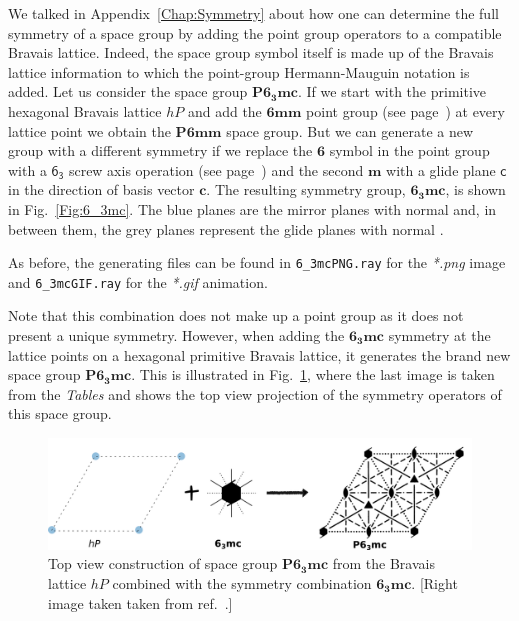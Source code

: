 We talked in Appendix~\ref{Chap:Symmetry} about how one can determine the full symmetry of a space group by adding the point group operators to a compatible Bravais lattice. Indeed, the space group symbol itself is made up of the Bravais lattice information to which the point-group Hermann-Mauguin notation is added. Let us consider the space group $\mathbf{P6_3mc}$. If we start with the primitive hexagonal Bravais lattice $hP$ and add the $\mathbf{6mm}$ point group (see page~\pageref{subChap:pointGroup}) at every lattice point we obtain the $\mathbf{P6mm}$ space group. But we can generate a new group with a different symmetry if we replace the $\mathbf{6}$ symbol in the point group with a $\mathsf{6_3}$ screw axis operation (see page~\pageref{sec:screw}) and the second $\mathbf{m}$ with a glide plane $\mathsf{c}$ in the direction of basis vector $\mathbf{c}$. The resulting symmetry group, $\mathbf{6_3mc}$, is shown in Fig.~\ref{Fig:6_3mc}. The blue planes are the mirror planes with normal  and, in between them, the grey planes represent the glide planes with normal . 


As before, the generating files can be found in \texttt{6\_3mcPNG.ray} for the \textit{*.png} image and \texttt{6\_3mcGIF.ray} for the \textit{*.gif} animation. 


Note that this combination does not make up a point group as it does not present a unique symmetry. However, when adding the $\mathbf{6_3mc}$ symmetry at the lattice points on a hexagonal primitive Bravais lattice, it generates the brand new space group $\mathbf{P6_3mc}$. This is illustrated in Fig.~\ref{Fig:P63mc}, where the last image is taken from the \textit{Tables} and shows the top view projection of the symmetry operators of this space group. 

\begin{figure}
    \centering
\includegraphics[width=0.9\linewidth]{Figures/spaceGroup.png}
\caption[Space group $\mathbf{P6_3mc}$.]{Top view construction of space group $\mathbf{P6_3mc}$ from the Bravais lattice $hP$ combined with the symmetry combination $\mathbf{6_3mc}$. [Right image taken taken from ref.~\cite{IntTableCrysA}.]}
\label{Fig:P63mc}
\end{figure}


